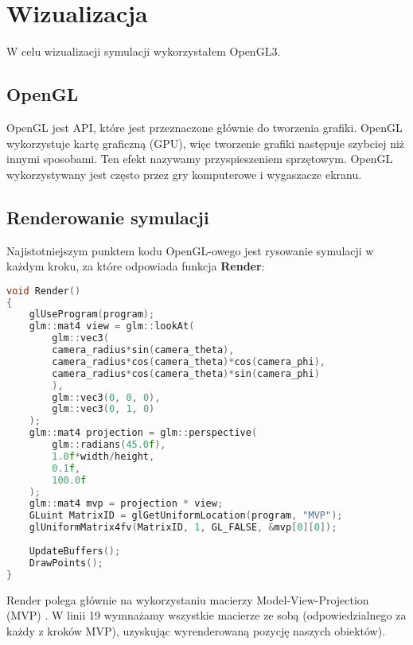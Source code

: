 \documentclass[14pt,twoside,a4paper]{article}
\theoremstyle{definition}
\begin{document}
\section{\LARGE Wizualizacja}
	
W celu wizualizacji symulacji wykorzystałem OpenGL3. 

\subsection{\large OpenGL}
OpenGL \cite{opengl} jest API, które jest przeznaczone głównie do tworzenia grafiki. OpenGL wykorzystuje kartę graficzną (GPU), więc tworzenie grafiki następuje szybciej niż innymi sposobami. Ten efekt nazywamy przyspieszeniem sprzętowym. OpenGL wykorzystywany jest często przez gry komputerowe i wygaszacze ekranu.

\subsection{\large Renderowanie symulacji}

Najistotniejszym punktem kodu OpenGL-owego jest rysowanie symulacji w każdym kroku, za które odpowiada funkcja \textbf{Render}:
\begin{lstlisting}[language=C++, frame=single, framerule=2pt, caption=Pseudokod renderowania symulacji]
void Render() 
{
    glUseProgram(program);
    glm::mat4 view = glm::lookAt(
        glm::vec3(
        camera_radius*sin(camera_theta),
        camera_radius*cos(camera_theta)*cos(camera_phi),
        camera_radius*cos(camera_theta)*sin(camera_phi)
        ),
        glm::vec3(0, 0, 0),
        glm::vec3(0, 1, 0)
    );
    glm::mat4 projection = glm::perspective(
        glm::radians(45.0f),
        1.0f*width/height,
        0.1f,
        100.0f
    );
    glm::mat4 mvp = projection * view;
    GLuint MatrixID = glGetUniformLocation(program, "MVP");
    glUniformMatrix4fv(MatrixID, 1, GL_FALSE, &mvp[0][0]);
    
    UpdateBuffers();
    DrawPoints();
}
\end{lstlisting}
\bigskip

Render polega głównie na wykorzystaniu macierzy Model-View-Projection (MVP) \cite{tutMat}. 
W linii 19 wymnażamy wszystkie macierze ze sobą (odpowiedzialnego za każdy z kroków MVP), uzyskując wyrenderowaną pozycję naszych obiektów).\\
\end{document}

